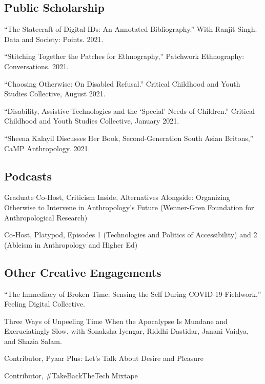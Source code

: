 \documentclass[11pt,letterpaper]{report}
\newcommand{\listitemspace}{0.25em}
\renewenvironment{itemize}{\begin{list}{}{\setlength{\leftmargin}{0em}\setlength{\parskip}{0em}\setlength{\itemsep}{\listitemspace}\setlength{\parsep}{\listitemspace}}}{\end{list}}
\begin{document}
    \subsection*{Public Scholarship}
    \begin{itemize}
        \item “The Statecraft of Digital IDs: An Annotated Bibliography.” With Ranjit Singh. Data and Society: Points. 2021.
        \item “Stitching Together the Patches for Ethnography,” Patchwork Ethnography: Conversations. 2021.
        \item “Choosing Otherwise: On Disabled Refusal.” Critical Childhood and Youth Studies Collective, August 2021.
        \item “Disability, Assistive Technologies and the ‘Special’ Needs of Children.” Critical Childhood and Youth Studies Collective, January 2021.
        \item “Sheena Kalayil Discusses Her Book, Second-Generation South Asian Britons,” CaMP Anthropology. 2021.
    \end{itemize}
    \subsection*{Podcasts}
    \begin{itemize}
        \item Graduate Co-Host, Criticism Inside, Alternatives Alongside: Organizing Otherwise to Intervene in Anthropology’s Future (Wenner-Gren Foundation for Anthropological Research)
        \item Co-Host, Platypod, Episodes 1 (Technologies and Politics of Accessibility) and 2 (Ableism in Anthropology and Higher Ed)
    \end{itemize}
    \subsection*{Other Creative Engagements}
    \begin{itemize}
        \item “The Immediacy of Broken Time: Sensing the Self During COVID-19 Fieldwork,” Feeling Digital Collective.
        \item Three Ways of Unpeeling Time When the Apocalypse Is Mundane and Excruciatingly Slow, with Sonaksha Iyengar, Riddhi Dastidar, Janani Vaidya, and Shazia Salam.
        \item Contributor, Pyaar Plus: Let’s Talk About Desire and Pleasure
        \item Contributor, \#TakeBackTheTech Mixtape
    \end{itemize}
\end{document}
